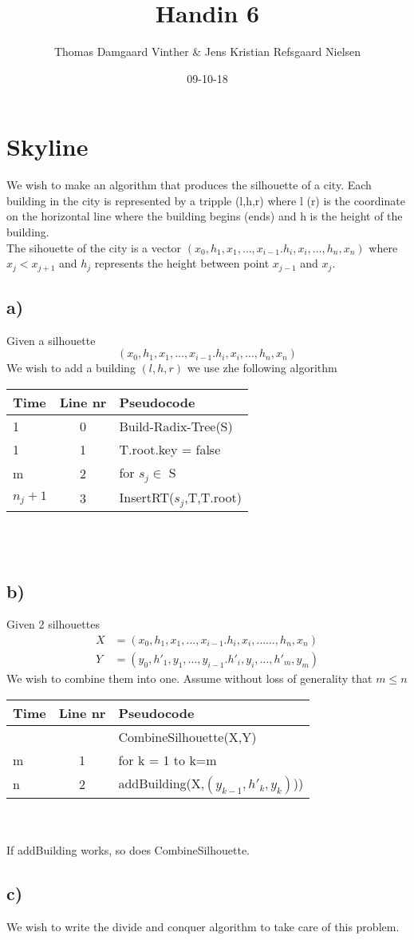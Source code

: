 \documentclass{article}
\theoremstyle{remark}
\numberwithin{equation}{section}
\begin{document}
	\author{Thomas Damgaard Vinther \& Jens Kristian Refsgaard Nielsen}
	\title{Handin 6}
	\date{09-10-18}
	\maketitle
\section{Skyline}
We wish to make an algorithm that produces the silhouette of a city. Each building in the city is represented by a tripple (l,h,r) where l (r) is the coordinate on the horizontal line where the building begins (ends) and h is the height of the building.
\\The sihouette of the city is a vector $(x_0,h_1,x_1,\dots,x_{i-1}.h_i,x_i,\dots,h_n,x_n)$ where $x_j<x_{j+1}$ and $h_j$ represents the height between point $x_{j-1}$ and $x_j$.
\subsection{a)}
Given a silhouette
\begin{equation}
	(x_0,h_1,x_1,\dots,x_{i-1}.h_i,x_i,\dots,h_n,x_n)
\end{equation}
We wish to add a building $(l,h,r)$ we use zhe following algorithm\\
\begin{tabular}{l | c | l}
	Time & Line nr & Pseudocode \\ \hline
	1&0&Build-Radix-Tree(S)\\
	1 & 1 & T.root.key = false\\
	m & 2 & for $s_j \in$ S\\
	\indent $n_j+1$ & 3 &\indent InsertRT($s_j$,T,T.root)\\
\end{tabular}\\\\
\subsection{b)}
Given 2 silhouettes
\begin{align}
	X&=(x_0,h_1,x_1,\dots,x_{i-1}.h_i,x_i,\dots\dots,h_n,x_n)\\
	Y&=(y_0,h'_1,y_1,\dots,y_{i-1}.h'_i,y_i,\dots,h'_m,y_m)
\end{align}
We wish to combine them into one. Assume without loss of generality that $m\leq n$\\
\begin{tabular}{l | c | l}
	Time & Line nr & Pseudocode \\ \hline
	&&CombineSilhouette(X,Y)\\
	m & 1 & for k = 1 to k=m\\
	\indent n & 2 & \indent addBuilding(X,$(y_{k-1},h'_k,y_k)$))\\
\end{tabular}\\\\
If addBuilding works, so does CombineSilhouette.
\subsection{c)}
We wish to write the divide and conquer algorithm to take care of this problem.
\end{document}
